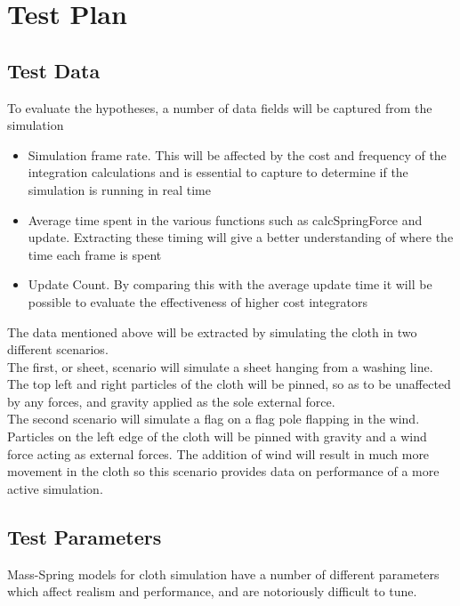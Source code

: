 \chapter{Test Plan}

\section{Test Data}
To evaluate the hypotheses, a number of data fields will be captured from the simulation
\begin{itemize}
\item{Simulation frame rate. This will be affected by the cost and frequency of the integration calculations and is essential to capture to determine if the simulation is running in real time}
\item{Average time spent in the various functions such as calcSpringForce and update. Extracting these timing will give a better understanding of where the time each frame is spent}
\item{Update Count. By comparing this with the average update time it will be possible to evaluate the effectiveness of higher cost integrators}
\end{itemize}
The data mentioned above will be extracted by simulating the cloth in two different scenarios.
\\The first, or sheet, scenario will simulate a sheet hanging from a washing line. The top left and right particles of the cloth will be pinned, so as to be unaffected by any forces, and gravity applied as the sole external force.
\\The second scenario will simulate a flag on a flag pole flapping in the wind. Particles on the left edge of the cloth will be pinned with gravity and a wind force acting as external forces. The addition of wind will result in much more movement in the cloth so this scenario provides data on performance of a more active simulation.

\section{Test Parameters}
Mass-Spring models for cloth simulation have a number of different parameters which affect realism and performance, and are notoriously difficult to tune.

